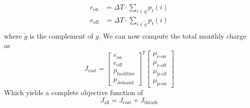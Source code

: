 \begin{equation}\begin{aligned}
	e_{\text{on}} &= \Delta T\cdot \sum_{i \in g}p_t(i) \\ 
	e_{\text{off}} &= \Delta T\cdot \sum_{i \in \tilde{g}}p_t(i) \\ 
\end{aligned}\end{equation}
where $\tilde{g}$ is the complement of $g$. We can now compute the total monthly charge as
\begin{equation}
J_{\text{cost}} = \begin{bmatrix}e_{\text{on}} \\ e_{\text{off}} \\ p_{\text{facilities}} \\ p_{\text{demand}} \end{bmatrix}^T \begin{bmatrix} \mu_{\text{e-on}} \\ \mu_{\text{e-off}} \\ \mu_{\text{p-all}} \\ \mu_{\text{p-on}} \end{bmatrix} 
\end{equation}
Which yields a complete objective function of
\begin{equation}
	J_{\text{all}} = J_{\text{cost}} + J_{\text{thrash}}
\end{equation}



